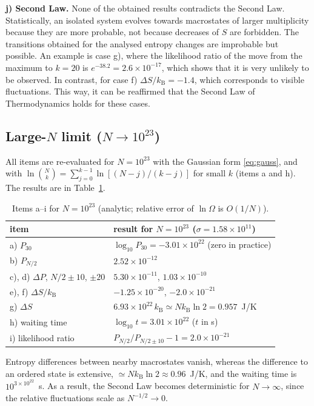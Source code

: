 \documentclass[11pt,a4paper]{article}
\newcommand{\kB}{k_{\mathrm B}}
\newcommand{\Om}{\Omega}
\begin{document}
\textbf{j) Second Law.} None of the obtained results contradicts the Second Law. Statistically, an isolated system evolves towards macrostates of larger multiplicity
because they are more probable, not because decreases of $S$ are forbidden. The transitions obtained for the analysed entropy changes are improbable but possible.
An example is case g), where the likelihood ratio of the move from the maximum to $k=20$ is $e^{-38.2}=2.6\times10^{-17}$, which shows that it is very unlikely to be observed.
In contrast, for case f) $\Delta S/\kB=-1.4$, which corresponds to visible fluctuations.
This way, it can be reaffirmed that the Second Law of Thermodynamics holds for these cases.

\subsection{Large-$N$ limit ($N\to10^{23}$)}\label{sec:largeN}
All items are re-evaluated for $N=10^{23}$ with the Gaussian form \eqref{eq:gauss}, and with $\ln\binom Nk=\sum_{j=0}^{k-1}\ln[(N-j)/(k-j)]$ for small $k$ (items a and h). The results are in Table~\ref{tab:large}.
\begin{table}[H]
\centering\small
\begin{tabular}{@{}ll@{}}
\toprule
item & result for $N=10^{23}$ ($\sigma=1.58\times10^{11}$) \\ \midrule
a) $P_{30}$ & $\log_{10}P_{30}=-3.01\times10^{22}$ (zero in practice) \\
b) $P_{N/2}$ & $2.52\times10^{-12}$ \\
c), d) $\Delta P$, $N/2\pm10$, $\pm20$ & $5.30\times10^{-11}$, $1.03\times10^{-10}$ \\
e), f) $\Delta S/\kB$ & $-1.25\times10^{-20}$, $-2.0\times10^{-21}$ \\
g) $\Delta S$ & $6.93\times10^{22}\,\kB\simeq N\kB\ln2=0.957$~J/K \\
h) waiting time & $\log_{10}t=3.01\times10^{22}$ ($t$ in s) \\
i) likelihood ratio & $P_{N/2}/P_{N/2\pm10}-1=2.0\times10^{-21}$ \\ \bottomrule
\end{tabular}
\caption{Items a--i for $N=10^{23}$ (analytic; relative error of $\ln\Om$ is $O(1/N)$).}
\label{tab:large}
\end{table}
Entropy differences between nearby macrostates vanish, whereas the difference to an ordered
state is extensive, $\simeq N\kB\ln2\approx0.96$~J/K, and the waiting time is $10^{3\times10^{22}}$~s. As a result, the Second Law becomes deterministic for $N\to\infty$, since the relative fluctuations scale as $N^{-1/2}\to0$.
\end{document}
